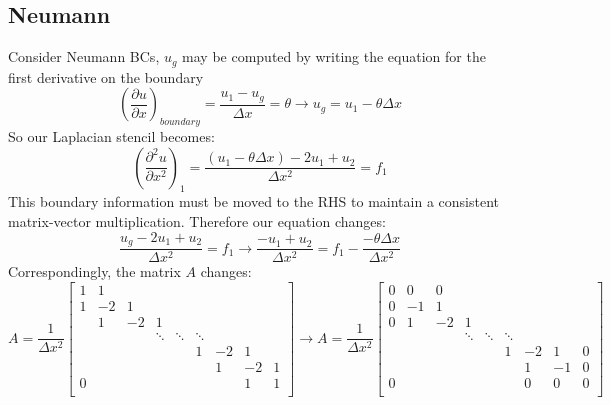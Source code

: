 \documentclass[landscape]{article}
\begin{document}
\subsection{Neumann}
Consider Neumann BCs, $u_g$ may be computed by writing the equation for the first derivative on the boundary
\begin{equation}
  \left(\frac{\partial u}{\partial x}\right)_{boundary}
  = \frac{u_1 - u_g}{\Delta x} = \theta
  \rightarrow
  u_g = u_1 - \theta \Delta x
\end{equation}
So our Laplacian stencil becomes:
\begin{equation}
   \left(\frac{\partial^2 u}{\partial x^2}\right)_{1} = 
   \frac{(u_1 - \theta \Delta x) - 2 u_1 + u_{2}}{\Delta x^2} = f_1
\end{equation}
This boundary information must be moved to the RHS to maintain a consistent matrix-vector multiplication. Therefore our equation changes:
\begin{equation}
   \frac{u_g - 2 u_1 + u_{2}}{\Delta x^2} = f_1
   \rightarrow
   \frac{- u_1 + u_{2}}{\Delta x^2} = f_1 - \frac{-\theta \Delta x}{\Delta x^2}
\end{equation}
Correspondingly, the matrix $A$ changes:
\[ A = \frac{1}{\Delta x^2} \left[\begin{array}{ccccccccc}
1  & 1     &           &           &           &           &           &         &    \\
1  & -2    & 1         &           &           &           &           &         &    \\
   & 1     & -2        & 1         &           &           &           &         &    \\
   &       &           & \ddots    & \ddots    & \ddots    &           &         &    \\
   &       &           &           &           & 1         & -2        & 1       &    \\
   &       &           &           &           &           &  1        & -2      &  1 \\
0  &       &           &           &           &           &           & 1       &  1 \\
\end{array} \right]
\rightarrow
A = \frac{1}{\Delta x^2} \left[\begin{array}{ccccccccc}
0  & 0     & 0         &           &           &           &           &         &    \\
0  & -1    & 1         &           &           &           &           &         &    \\
0  & 1     & -2        & 1         &           &           &           &         &    \\
   &       &           & \ddots    & \ddots    & \ddots    &           &         &    \\
   &       &           &           &           & 1         & -2        & 1       &  0 \\
   &       &           &           &           &           &  1        & -1      &  0 \\
0  &       &           &           &           &           &  0        & 0       &  0 \\
\end{array} \right]
\]
\end{document}
